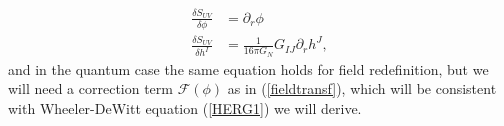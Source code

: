 \documentclass[12pt,epsbox]{article}
\numberwithin{equation}{section}
\begin{document}

\begin{equation}
\begin{split}
\frac{\delta S_{UV}}{\delta \phi} &= \partial_r \phi\\
\frac{\delta S_{UV}}{\delta h^I}  &=  \frac{1}{16\pi G_N} G_{IJ} \partial_r h^{J} \label{velocity},
\end{split}
\end{equation}
and in the quantum case the same equation holds for field redefinition, but we will need a correction term $\mathcal{F}(\phi)$ as in (\ref{fieldtransf}), which will be consistent with Wheeler-DeWitt equation (\ref{HERG1}) we will derive.


\end{document}
